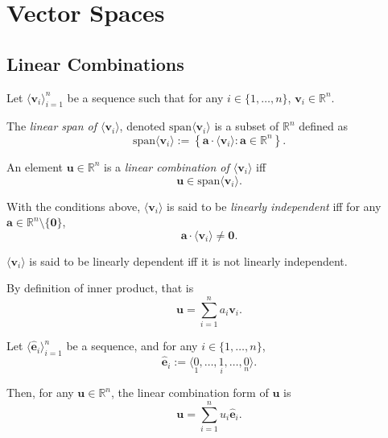 
\chapter{Vector Spaces}


\section{Linear Combinations}


\begin{definition}
	\label{def: span and linear combination}
	Let $\langle\mathbf v_i\rangle_{i = 1}^n$ be a sequence such that for any $i \in \{1, \ldots, n\}$, $\mathbf v_i \in \mathbb R^n$.
	
	The \textit{linear span of $\langle \mathbf v_i\rangle$}, denoted $\mathrm{span}\langle \mathbf v_i\rangle$ is a subset of $\mathbb R^n$ defined as
	$$
	\mathrm{span}\langle \mathbf v_i\rangle := \left\{ \mathbf a \cdot \langle \mathbf v_i \rangle : \mathbf a \in \mathbb R^n \right\}.
	$$
	
	An element $\mathbf u \in \mathbb R^n$ is a \textit{linear combination of $\langle \mathbf v_i \rangle$} iff
	$$
	\mathbf u \in \mathrm{span} \langle \mathbf v_i \rangle.
	$$
\end{definition}


\begin{definition}
	\label{def: linear dependency}
	With the conditions above, $\langle \mathbf v_i \rangle$ is said to be \textit{linearly independent} iff for any $\mathbf a \in \mathbb R^n \setminus \{\mathbf 0\}$,
	$$
	\mathbf a \cdot \langle \mathbf v_i \rangle \ne \mathbf 0. 
	$$
	
	$\langle \mathbf v_i \rangle$ is said to be linearly dependent iff it is not linearly independent.
\end{definition}


\begin{note}
	By definition of inner product, that is
	$$
	\mathbf u = \sum_{i = 1}^n a_i \mathbf v_i.
	$$
\end{note}



\begin{note}
	Let $\langle \mathbf{\hat e}_i \rangle_{i = 1}^n$ be a sequence, and for any $i \in \{1, \ldots, n\}$,
	$$
	\mathbf{\hat e}_i := \langle \underset{1}{0}, \ldots, \underset{i}{1}, \ldots, \underset{n}{0} \rangle.
	$$
	
	Then, for any $\mathbf u \in \mathbb R^n$, the linear combination form of $\mathbf u$ is
	$$
	\mathbf u = \sum_{i = 1}^n u_i \mathbf{\hat e}_i.
	$$
\end{note}



